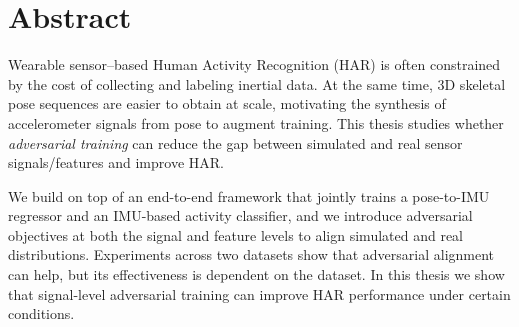 \section*{Abstract}
Wearable sensor--based Human Activity Recognition (HAR) is often constrained by the cost of collecting and labeling inertial data. At the same time, 3D skeletal pose sequences are easier to obtain at scale, motivating the synthesis of accelerometer signals from pose to augment training. This thesis studies whether \emph{adversarial training} can reduce the gap between simulated and real sensor signals/features and improve HAR.

We build on top of an end-to-end framework that jointly trains a pose-to-IMU regressor and an IMU-based activity classifier, and we introduce adversarial objectives at both the signal and feature levels to align simulated and real distributions. Experiments across two datasets show that adversarial alignment can help, but its effectiveness is dependent on the dataset. In this thesis we show that signal-level adversarial training can improve HAR performance under certain conditions.
